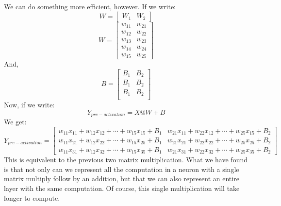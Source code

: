 \documentclass[12pt,a4paper]{article}
\begin{document}
We can do something more efficient, however.
If we write:
\[
W = \begin{bmatrix}
    W_1 & W_2
\end{bmatrix}
\]
\[
W = \begin{bmatrix}
    w_{11} & w_{21} \\
    w_{12} & w_{22} \\
    w_{13} & w_{23} \\
    w_{14} & w_{24} \\
    w_{15} & w_{25}
\end{bmatrix}
\]
And,
\[
B = \begin{bmatrix}
    B_1 & B_2 \\
    B_1 & B_2 \\
    B_1 & B_2 \\
\end{bmatrix}
\]
Now, if we write:
\[
Y_{pre-activation} = X @ W + B
\]
We get:
\[
Y_{pre-activation} = \begin{bmatrix}
    w_{11}x_{11} + w_{12}x_{12}+ \cdots + w_{15}x_{15} + B_1  & w_{21}x_{11} + w_{22}x_{12} + \cdots + w_{25}x_{15} + B_2 \\
    w_{11}x_{21} + w_{12}x_{22} + \cdots + w_{15}x_{25} + B_1  & w_{21}x_{21} + w_{22}x_{22} + \cdots + w_{25}x_{25} + B_2 \\
    w_{11}x_{31} + w_{12}x_{32} + \cdots + w_{15}x_{35} + B_1  & w_{21}x_{31} + w_{22}x_{32} + \cdots + w_{25}x_{35} + B_2 
\end{bmatrix}
\]
This is equivalent to the previous two matrix multiplication. What we have found is that not only can we represent all the computation in a neuron with a single matrix multiply follow by an addition, but that we can also represent an entire layer with the same computation. Of course, this single multiplication will take longer to compute.
\end{document}
